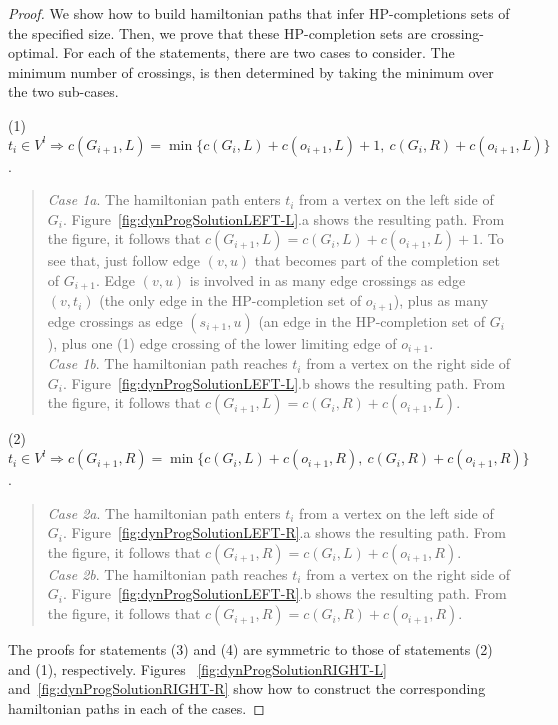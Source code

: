 \documentclass{myllncs-mixalis}
\begin{document}
\begin{proof}
We show how to build hamiltonian paths that infer HP-completions
sets of the specified size. Then, we prove that these HP-completion
sets are crossing-optimal. For each of the statements, there are two
cases to consider. The minimum number of crossings, is then
determined by taking the minimum over the two sub-cases.

 (1) $t_{i}
\in V^l \Rightarrow c(G_{i+1},L)=\min \{
    c(G_{i},L)+c(o_{i+1},L)+1,~
    c(G_{i},R)+c(o_{i+1},L)
\}$. \begin{quote}
\hspace*{-.4cm}\emph{Case 1a}. The hamiltonian path
  enters $t_{i}$ from a vertex on the left side of $G_i$.
 Figure~\ref{fig:dynProgSolutionLEFT-L}.a shows the resulting path.
 From the figure, it follows that $c(G_{i+1},L)=c(G_{i},L)+c(o_{i+1},L)+1$. To see that, just follow
 edge $(v,u)$ that becomes part of the completion set of $G_{i+1}$.
 Edge $(v,u)$ is involved in as many edge crossings as edge $(v,t_i)$
 (the only edge in the HP-completion set of $o_{i+1}$),
 plus as many edge crossings as edge $(s_{i+1},u)$
 (an edge in the HP-completion set of $G_{i}$), plus one (1) edge
 crossing of the lower
 limiting edge of $o_{i+1}$.\\
\hspace*{-.4cm}\emph{Case 1b}. The hamiltonian path  reaches
$t_{i}$
 from a vertex on the right side of $G_i$.
 Figure~\ref{fig:dynProgSolutionLEFT-L}.b shows the resulting path.
 From the figure, it follows that $c(G_{i+1},L)=
    c(G_{i},R)+c(o_{i+1},L)$.
 \end{quote}

 (2) $t_{i} \in V^l \Rightarrow  c(G_{i+1},R)=\min \{
    c(G_{i},L)+c(o_{i+1},R),~
    c(G_{i},R)+c(o_{i+1},R)
\} $. \vspace*{-.4cm}
 \begin{quote}
\hspace*{-.4cm}\emph{Case 2a}. The hamiltonian path
  enters $t_{i}$ from a vertex on the left side of $G_i$.
 Figure~\ref{fig:dynProgSolutionLEFT-R}.a shows the resulting path.
 From the figure, it follows that $c(G_{i+1},R)=c(G_{i},L)+c(o_{i+1},R)$.\\
\hspace*{-.4cm}\emph{Case 2b}. The hamiltonian path  reaches
$t_{i}$
 from a vertex on the right side of $G_i$.
 Figure~\ref{fig:dynProgSolutionLEFT-R}.b shows the resulting path.
 From the figure, it follows that $c(G_{i+1},R)=
    c(G_{i},R)+c(o_{i+1},R)$.
 \end{quote}
The proofs for statements (3) and (4) are symmetric to those of
statements (2) and (1), respectively. Figures
~\ref{fig:dynProgSolutionRIGHT-L}
and~\ref{fig:dynProgSolutionRIGHT-R} show how to construct the
corresponding hamiltonian paths in each of the cases.



\end{proof}
\end{document}
